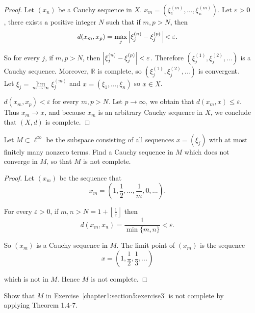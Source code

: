 \begin{proof}
    Let $(x_{n})$ be a Cauchy sequence in $X$. $x_{m} = (\xi_{1}^{(m)}, \ldots, \xi_{n}^{(m)})$. Let $\varepsilon > 0$, there exists a positive integer $N$ such that if $m, p > N$, then
    \[
        d(x_{m}, x_{p}) = \max_{j}\left\vert{\xi_{j}^{(n)} - \xi_{j}^{(p)}}\right\vert < \varepsilon.
    \]

    So for every $j$, if $m, p > N$, then $\left\vert{\xi_{j}^{(n)} - \xi_{j}^{(p)}}\right\vert < \varepsilon$. Therefore $(\xi_{j}^{(1)}, \xi_{j}^{(2)}, \ldots)$ is a Cauchy sequence. Moreover, $\mathbb{R}$ is complete, so $(\xi_{j}^{(1)}, \xi_{j}^{(2)}, \ldots)$ is convergent. Let $\xi_{j} = \lim\limits_{m\to\infty}\xi_{j}^{(m)}$ and $x = (\xi_{1}, \ldots, \xi_{n})$ so $x\in X$.

    $d(x_{m}, x_{p}) < \varepsilon$ for every $m, p > N$. Let $p\to\infty$, we obtain that $d(x_{m}, x)\leq \varepsilon$. Thus $x_{m}\to x$, and because $x_{m}$ is an arbitrary Cauchy sequence in $X$, we conclude that $(X, d)$ is complete.
\end{proof}

\begin{exercise}\label{chapter1:section5:exercise3}
    Let $M\subset \ell^{\infty}$ be the subspace consisting of all sequences $x = (\xi_{j})$ with at most finitely many nonzero terms. Find a Cauchy sequence in $M$ which does not converge in $M$, so that $M$ is not complete.
\end{exercise}

\begin{proof}
    Let $(x_{m})$ be the sequence that
    \[
        x_{m} = \left(1, \frac{1}{2}, \ldots, \frac{1}{m}, 0, \ldots\right).
    \]

    For every $\varepsilon > 0$, if $m, n > N = 1 + \left\lfloor\frac{1}{\varepsilon}\right\rfloor$ then
    \[
        d(x_{m}, x_{n}) = \frac{1}{\min\{ m, n \}} < \varepsilon.
    \]

    So $(x_{m})$ is a Cauchy sequence in $M$. The limit point of $(x_{m})$ is the sequence
    \[
        x = \left(1, \frac{1}{2}, \frac{1}{3}, \ldots\right)
    \]

    which is not in $M$. Hence $M$ is not complete.
\end{proof}

\begin{exercise}\label{chapter1:section5:exercise4}
    Show that $M$ in Exercise~\ref{chapter1:section5:exercise3} is not complete by applying Theorem 1.4-7.
\end{exercise}

